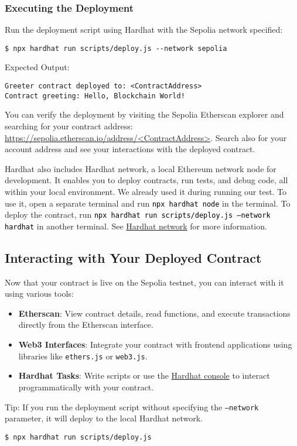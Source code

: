 \documentclass[12pt]{article}
\newcommand{\codegrey}[1]{%
  \texttt{\colorbox{black!4}{\textcolor{black}{#1}}}%
}
\begin{document}
\subsubsection{Executing the Deployment}

Run the deployment script using Hardhat with the Sepolia network specified:

\begin{verbatim}
$ npx hardhat run scripts/deploy.js --network sepolia
\end{verbatim}
Expected Output:
\begin{verbatim}
Greeter contract deployed to: <ContractAddress>
Contract greeting: Hello, Blockchain World!
\end{verbatim}
You can verify the deployment by visiting the Sepolia Etherscan explorer and searching for your contract address: \url{https://sepolia.etherscan.io/address/<ContractAddress>}. Search also for your account address and see your interactions with the deployed contract.

\noindent
Hardhat also includes Hardhat network, a local Ethereum network node for development. It enables you to deploy contracts, run tests, and debug code, all within your local environment. We already used it during running our test. To use it, open a separate terminal and run \codegrey{npx hardhat node} in the terminal. To deploy the contract, run \codegrey{npx hardhat run scripts/deploy.js --network hardhat} in another terminal. See \href{https://hardhat.org/hardhat-network/docs/overview\#hardhat-network}{Hardhat network} for more information.

\subsection{Interacting with Your Deployed Contract}

Now that your contract is live on the Sepolia testnet, you can interact with it using various tools:

\begin{itemize}
    \item \textbf{Etherscan}: View contract details, read functions, and execute transactions directly from the Etherscan interface.
    
    \item \textbf{Web3 Interfaces}: Integrate your contract with frontend applications using libraries like \texttt{ethers.js} or \texttt{web3.js}.
    
    \item \textbf{Hardhat Tasks}: Write scripts or use the \href{https://hardhat.org/hardhat-runner/docs/guides/hardhat-console}{Hardhat console} to interact programmatically with your contract.
\end{itemize}
Tip: If you run the deployment script without specifying the \texttt{--network} parameter, it will deploy to the local Hardhat network.
\begin{verbatim}
$ npx hardhat run scripts/deploy.js
\end{verbatim}
\end{document}
